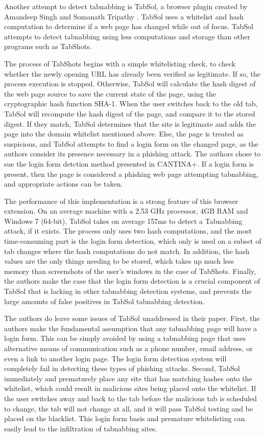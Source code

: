 \documentclass[12pt]{article}
\begin{document}
\begin{doublespace}
Another attempt to detect tabnabbing is TabSol, a browser plugin created by Amandeep Singh and Somanath Tripathy \cite{TabSol}.  TabSol uses a whitelist and hash computation to determine if a web page has changed while out of focus.  TabSol attempts to detect tabnabbing using less computations and storage than other programs such as TabShots.

The process of TabShots begins with a simple whitelisting check, to check whether the newly opening URL has already been verified as legitimate.  If so, the process execution is stopped.  Otherwise, TabSol will calculate the hash digest of the web page source to save the current state of the page, using the cryptographic hash function SHA-1.  When the user switches back to the old tab, TabSol will recompute the hash digest of the page, and compare it to the stored digest.  If they match, TabSol determines that the site is legitimate and adds the page into the domain whitelist mentioned above.  Else, the page is treated as suspicious, and TabSol attempts to find a login form on the changed page, as the authors consider its presence necessary in a phishing attack.  The authors chose to sue the login form detction method presented in CANTINA+.  If a login form is present, then the page is considered a phishing web page attempting tabnabbing, and appropriate actions can be taken.

The performance of this implementation is a strong feature of this browser extension.  On an average machine with a 2.53 GHz processor, 4GB RAM and Windows 7 (64-bit), TabSol takes on average 157ms to detect a Tabnabbing attack, if it exists.  The process only uses two hash computations, and the most time-consuming part is the login form detection, which only is used on a subset of tab changes where the hash computations do not match.  In addition, the hash values are the only things needing to be stored, which takes up much less memory than screenshots of the user's windows in the case of TabShots.  Finally, the authors make the case that the login form detection is a crucial component of TabSol that is lacking in other tabnabbing detection systems, and prevents the large amounts of false positives in TabSol tabnabbing detection.

The authors do leave some issues of TabSol unaddressed in their paper.  First, the authors make the fundamental assumption that any tabnabbing page will have a login form.  This can be simply avoided by using a tabnabbing page that uses alternative means of communication such as a phone number, email address, or even a link to another login page.  The login form detection system will completely fail in detecting these types of phishing attacks.  Second, TabSol immediately and prematurely place any site that has matching hashes onto the whitelist, which could result in malicious sites being placed onto the whitelist.  If the user switches away and back to the tab before the malicious tab is scheduled to change, the tab will not change at all, and it will pass TabSol testing and be placed on the blacklist.  This login form basis and premature whitelisting can easily lead to the infiltration of tabnabbing sites.


\end{doublespace}
\end{document}

